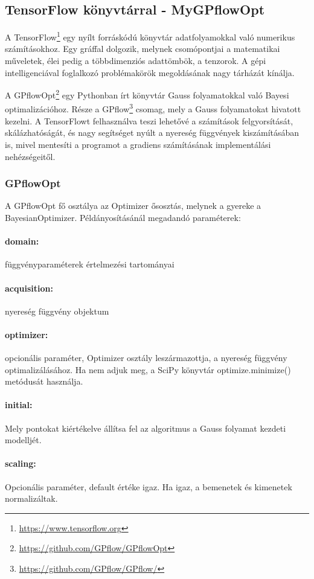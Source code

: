 \subsection{TensorFlow könyvtárral - MyGPflowOpt}
A TensorFlow\footnote{\url{https://www.tensorflow.org}} egy nyílt forráskódú könyvtár adatfolyamokkal való numerikus számításokhoz. Egy gráffal dolgozik, melynek csomópontjai a matematikai műveletek, élei pedig a többdimenziós adattömbök, a tenzorok. A gépi intelligenciával foglalkozó problémakörök megoldásának nagy tárházát kínálja.

A GPflowOpt\footnote{\url{https://github.com/GPflow/GPflowOpt}} egy Pythonban írt könyvtár Gauss folyamatokkal való Bayesi optimalizációhoz. Része a GPflow\footnote{\url{https://github.com/GPflow/GPflow/}} csomag, mely a Gauss folyamatokat hivatott kezelni. A TensorFlowt felhasználva teszi lehetővé a számítások felgyorsítását, skálázhatóságát, és nagy segítséget nyúlt a nyereség függvények kiszámításában is, mivel mentesíti a programot a gradiens számításának implementálási nehézségeitől.

\subsubsection{GPflowOpt}

A GPflowOpt fő osztálya az Optimizer ősosztás, melynek a gyereke a BayesianOptimizer. Példányosításánál megadandó paraméterek:
\paragraph{domain:} függvényparaméterek értelmezési tartományai
\paragraph{acquisition:} nyereség függvény objektum
\paragraph{optimizer:} opcionális paraméter, Optimizer osztály leszármazottja, a nyereség függvény optimalizálásához. Ha nem adjuk meg, a SciPy könyvtár optimize.minimize() metódusát használja.
\paragraph{initial:} Mely pontokat kiértékelve állítsa fel az algoritmus a Gauss folyamat kezdeti modelljét.
\paragraph{scaling:} Opcionális paraméter, default értéke igaz. Ha igaz, a bemenetek és kimenetek normalizáltak.
